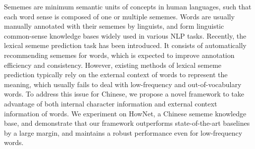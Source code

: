 Sememes are minimum semantic units of concepts in human languages, such that each word sense is composed of one or multiple sememes. Words are usually manually annotated with their sememes by linguists, and form linguistic common-sense knowledge bases widely used in various NLP tasks. Recently, the lexical sememe prediction task has been introduced. It consists of automatically recommending sememes for words, which is expected to improve annotation efficiency and consistency. However, existing methods of lexical sememe prediction typically rely on the external context of words to represent the meaning, which usually fails to deal with low-frequency and out-of-vocabulary words. To address this issue for Chinese, we propose a novel framework to take advantage of both internal character information and external context information of words. We experiment on HowNet, a Chinese sememe knowledge base, and demonstrate that our framework outperforms state-of-the-art baselines by a large margin, and maintains a robust performance even for low-frequency words.
